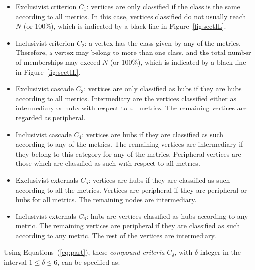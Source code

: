 \documentclass[%
aip,
jmp,%
amsmath,amssymb,
reprint,%
]{revtex4-1}
\begin{document}
\begin{itemize}
\item Exclusivist criterion $C_1$:  vertices are only classified if the class is the same according to all metrics. In this case, vertices classified do not usually reach $N$ (or 100\%), which is indicated by a black line in Figure~\ref{fig:sectIL}.

\item Inclusivist criterion $C_2$: a vertex has the class given by any of the metrics. Therefore, a vertex may belong to more than one class, and the total number of memberships may exceed $N$ (or 100\%), which is indicated by a black line in Figure~\ref{fig:sectIL}.

\item Exclusivist cascade $C_3$: vertices are only classified as hubs if they are hubs according to all metrics. Intermediary are the vertices classified either as intermediary or hubs with respect to all metrics. The remaining vertices are regarded as peripheral.

\item Inclusivist cascade $C_4$: vertices are hubs if they are classified as such according to any of the metrics. The remaining vertices are intermediary if they belong to this category for any of the metrics. Peripheral vertices are those which are classified as such with respect to all metrics.

\item Exclusivist externals $C_5$: vertices are hubs if they are classified as such according to all the metrics. Vertices are peripheral if they are peripheral or hubs for all metrics. The remaining nodes are intermediary.

\item Inclusivist externals $C_6$: hubs are vertices classified as hubs according to any metric. The remaining vertices are peripheral if they are classified as such according to any metric. The rest of the vertices are intermediary.
\end{itemize}

Using Equations~(\ref{eq:part}), these \emph{compound criteria} $C_\delta$, with $\delta$ integer in the interval $1\leq\delta\leq6$, can be specified as:
\end{document}
